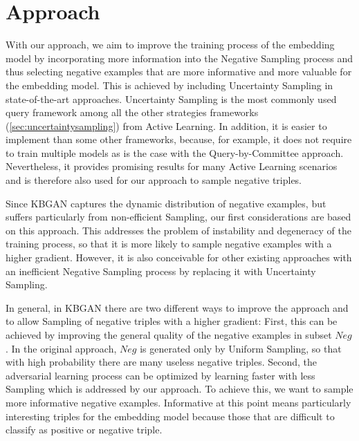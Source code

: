 \chapter{Approach}
\label{ch:approach}

With our approach, we aim to improve the training process of the embedding model by incorporating more information into the Negative Sampling process and thus selecting negative examples that are more informative and more valuable for the embedding model.
This is achieved by including Uncertainty Sampling in state-of-the-art approaches.
Uncertainty Sampling is the most commonly used query framework among all the other strategies frameworks (\autoref{sec:uncertaintysampling}) from Active Learning.
In addition, it is easier to implement than some other frameworks, because, for example, it does not require to train multiple models as is the case with the Query-by-Committee approach.
Nevertheless, it provides promising results for many Active Learning scenarios and is therefore also used for our approach to sample negative triples.

Since \ac{KBGAN} captures the dynamic distribution of negative examples, but suffers particularly from non-efficient Sampling, our first considerations are based on this approach.
This addresses the problem of instability and degeneracy of the training process, so that it is more likely to sample negative examples with a higher gradient.
However, it is also conceivable for other existing approaches with an inefficient Negative Sampling process by replacing it with Uncertainty Sampling.

In general, in \ac{KBGAN} there are two different ways to improve the approach and to allow Sampling of negative triples with a higher gradient:
First, this can be achieved by improving the general quality of the negative examples in subset $Neg$.
In the original approach, $Neg$ is generated only by Uniform Sampling, so that with high probability there are many useless negative triples.
Second, the adversarial learning process can be optimized by learning faster with less Sampling which is addressed by our approach.
To achieve this, we want to sample more informative negative examples.
Informative at this point means particularly interesting triples for the embedding model because those that are difficult to classify as positive or negative triple.

